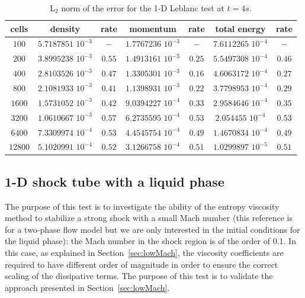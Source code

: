 \documentclass[preprint,10pt]{elsarticle}
\newcommand{\sct}[1]{Section~\ref{#1}}                   %
\newcommand{\tcr}[1]{\textcolor{red}{#1}}
\newcommand{\tcb}[1]{\textcolor{blue}{#1}}
\begin{document}
\begin{table}[!htbp]
\begin{center}
 \caption{\label{tbl:l2_norm_leblanc} L$_2$ norm of the error for the 1-D Leblanc test at $t=4s$.}
 \begin{tabular}{|c|c|c|c|c|c|c|}
 \hline
   cells & density & rate & momentum & rate & total energy & rate \\ \hline
$100$ &   $5.7187851$ $10^{-3}$ & $-$ & $1.7767236$ $10^{-3}$ & $-$ & $7.6112265$  $10^{-4}$& $-$\\   \hline
$200$  &  $3.8995238$ $10^{-3}$ & $0.55$ & $1.4913161$ $10^{-3}$ & $0.25$ &  $5.5497308$ $10^{-4}$& $0.46$\\ \hline
$400$ & $2.8103526$ $10^{-3}$   & $0.47$ & $1.3305301$ $10^{-3}$ & $0.16$ & $4.6063172$ $10^{-4}$ & $0.27$\\ \hline
$800$ & $2.1081933$ $10^{-3}$   & $0.41$ & $1.1398931$ $10^{-3}$ & $0.22$ & $3.7798953$ $10^{-4}$ & $0.29$\\ \hline
$1600$ & $1.5731052$ $10^{-3}$  & $0.42$ & $9.0394227$ $10^{-4}$ & $0.33$ & $2.9584646$ $10^{-4}$ & $0.35$\\ \hline
$3200$&$1.0610667$ $10^{-3}$    & $0.57$ & $6.2735595$ $10^{-4}$ & $0.53$ & $2.054455$ $10^{-4}$ & $0.53$\\ \hline
$6400$&$7.3309974$ $10^{-4}$    & $0.53$ & $4.4545754$ $10^{-4}$ & $0.49$ & $1.4670834$ $10^{-4}$ & $0.49$\\ \hline
 $12800$&$5.1020991$ $10^{-4}$  & $0.52$ & $3.1266758$ $10^{-4}$ & $0.51$ & $1.0299897$ $10^{-5}$ & $0.51$\\  \hline
\end{tabular}
\end{center}
\nonumber
\end{table}

\subsection{1-D shock tube with a liquid phase} \label{sec:liquid_shock}
The purpose of this test is to investigate the ability of the entropy viscosity method to stabilize a strong 
shock with a small Mach number \cite{abgrall} (this reference is for a two-phase flow model but we are only 
interested in the initial conditions for the liquid phase): the Mach number in the shock region is of the 
order of 0.1. In this case, as explained in \sct{sec:lowMach}, the viscosity coefficients are required to 
have different order of magnitude in order to ensure the correct scaling of the dissipative terms. 
The purpose of this test is to validate the approach presented in \sct{sec:lowMach}. 
\end{document}
